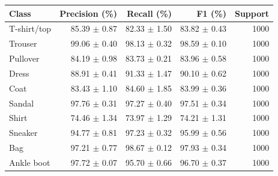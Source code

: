 \begin{tabular}{lrrrr}
\toprule
Class & Precision (\%) & Recall (\%) & F1 (\%) & Support \\
\midrule
T-shirt/top & 85.39 $\pm$ 0.87 & 82.33 $\pm$ 1.50 & 83.82 $\pm$ 0.43 & 1000 \\
Trouser & 99.06 $\pm$ 0.40 & 98.13 $\pm$ 0.32 & 98.59 $\pm$ 0.10 & 1000 \\
Pullover & 84.19 $\pm$ 0.98 & 83.73 $\pm$ 0.21 & 83.96 $\pm$ 0.58 & 1000 \\
Dress & 88.91 $\pm$ 0.41 & 91.33 $\pm$ 1.47 & 90.10 $\pm$ 0.62 & 1000 \\
Coat & 83.43 $\pm$ 1.10 & 84.60 $\pm$ 1.85 & 83.99 $\pm$ 0.36 & 1000 \\
Sandal & 97.76 $\pm$ 0.31 & 97.27 $\pm$ 0.40 & 97.51 $\pm$ 0.34 & 1000 \\
Shirt & 74.46 $\pm$ 1.34 & 73.97 $\pm$ 1.29 & 74.21 $\pm$ 1.31 & 1000 \\
Sneaker & 94.77 $\pm$ 0.81 & 97.23 $\pm$ 0.32 & 95.99 $\pm$ 0.56 & 1000 \\
Bag & 97.21 $\pm$ 0.77 & 98.67 $\pm$ 0.12 & 97.93 $\pm$ 0.34 & 1000 \\
Ankle boot & 97.72 $\pm$ 0.07 & 95.70 $\pm$ 0.66 & 96.70 $\pm$ 0.37 & 1000 \\
\bottomrule
\end{tabular}
